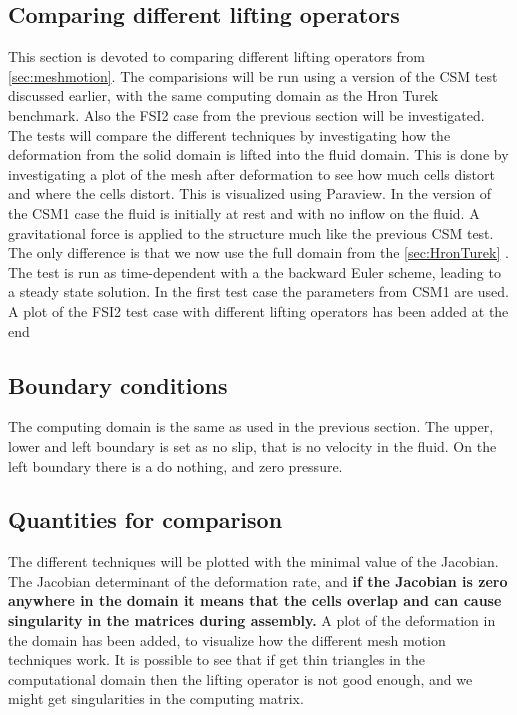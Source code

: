 \subsection{Comparing different lifting operators}\label{sec:mesh_motion}
This section is devoted to comparing different lifting operators from \ref{sec:meshmotion}. The comparisions will be run using a version of the CSM test discussed earlier, with the same computing domain as the Hron Turek benchmark. Also the FSI2 case from the previous section will be investigated. The tests will compare the different techniques by investigating how the deformation from the solid domain is lifted into the fluid domain. This is done by investigating a plot of the mesh after deformation to see how much cells distort and where the cells distort. This is visualized using Paraview.\newline
In the version of the CSM1 case the fluid is initially at rest and with no inflow on the fluid. A gravitational force is applied to the structure much like the previous CSM test. The only difference is that we now use the full domain from the \ref{sec:HronTurek} . The test is run as time-dependent with a the backward Euler scheme, leading to a steady state solution. In the first test case the parameters from CSM1 are used. \newline
A plot of the FSI2 test case with different lifting operators has been added at the end

\subsection*{Boundary conditions}
The computing domain is the same as used in the previous section.
The upper, lower and left boundary is set as no slip, that is no velocity in the fluid. On the left boundary there is a do nothing, and zero pressure. 
\subsection*{Quantities for comparison}
The different techniques will be plotted with the minimal value of the Jacobian. The Jacobian determinant of the deformation rate, and \textbf{if the Jacobian is zero anywhere in the domain it means that the cells overlap and can cause singularity in the matrices during assembly.} \newline
A plot of the deformation in the domain has been added, to visualize how the different mesh motion techniques work. It is possible to see that if get thin triangles in the computational domain then the lifting operator is not good enough, and we might get singularities in the computing matrix.
